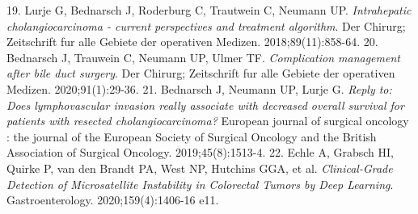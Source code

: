 \documentclass[12pt]{article}
\begin{document}
\begin{thebibliography}{22}
19.	Lurje G, Bednarsch J, Roderburg C, Trautwein C, Neumann UP. \textit{Intrahepatic cholangiocarcinoma - current perspectives and treatment algorithm}. Der Chirurg; Zeitschrift fur alle Gebiete der operativen Medizen. 2018;89(11):858-64.
20.	Bednarsch J, Trauwein C, Neumann UP, Ulmer TF. \textit{Complication management after bile duct surgery}. Der Chirurg; Zeitschrift fur alle Gebiete der operativen Medizen. 2020;91(1):29-36.
21.	Bednarsch J, Neumann UP, Lurje G. \textit{Reply to: Does lymphovascular invasion really associate with decreased overall survival for patients with resected cholangiocarcinoma?} European journal of surgical oncology : the journal of the European Society of Surgical Oncology and the British Association of Surgical Oncology. 2019;45(8):1513-4.
22.	Echle A, Grabsch HI, Quirke P, van den Brandt PA, West NP, Hutchins GGA, et al. \textit{Clinical-Grade Detection of Microsatellite Instability in Colorectal Tumors by Deep Learning}. Gastroenterology. 2020;159(4):1406-16 e11.
\end{thebibliography}
%
%
\end{document}
